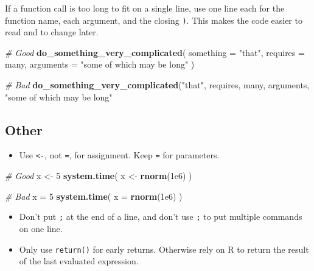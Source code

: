 \documentclass[]{book}
\newenvironment{Shaded}{\begin{snugshade}}{\end{snugshade}}
\newcommand{\KeywordTok}[1]{\textcolor[rgb]{0.13,0.29,0.53}{\textbf{#1}}}
\newcommand{\DataTypeTok}[1]{\textcolor[rgb]{0.13,0.29,0.53}{#1}}
\newcommand{\DecValTok}[1]{\textcolor[rgb]{0.00,0.00,0.81}{#1}}
\newcommand{\FloatTok}[1]{\textcolor[rgb]{0.00,0.00,0.81}{#1}}
\newcommand{\StringTok}[1]{\textcolor[rgb]{0.31,0.60,0.02}{#1}}
\newcommand{\CommentTok}[1]{\textcolor[rgb]{0.56,0.35,0.01}{\textit{#1}}}
\newcommand{\NormalTok}[1]{#1}
\providecommand{\tightlist}{%
  \setlength{\itemsep}{0pt}\setlength{\parskip}{0pt}}
\begin{document}
If a function call is too long to fit on a single line, use one line
each for the function name, each argument, and the closing \texttt{)}.
This makes the code easier to read and to change later.

\begin{Shaded}
\begin{Highlighting}[]
\CommentTok{# Good}
\KeywordTok{do_something_very_complicated}\NormalTok{(}
  \DataTypeTok{something =} \StringTok{"that"}\NormalTok{,}
  \DataTypeTok{requires  =}\NormalTok{ many,}
  \DataTypeTok{arguments =} \StringTok{"some of which may be long"}
\NormalTok{)}

\CommentTok{# Bad}
\KeywordTok{do_something_very_complicated}\NormalTok{(}\StringTok{"that"}\NormalTok{, requires, many, arguments,}
                              \StringTok{"some of which may be long"}
\end{Highlighting}
\end{Shaded}

\subsection{Other}\label{other}

\begin{itemize}
\tightlist
\item
  Use \texttt{\textless{}-}, not \texttt{=}, for assignment. Keep
  \texttt{=} for parameters.
\end{itemize}

\begin{Shaded}
\begin{Highlighting}[]
\CommentTok{# Good}
\NormalTok{x <-}\StringTok{ }\DecValTok{5}
\KeywordTok{system.time}\NormalTok{(}
\NormalTok{  x <-}\StringTok{ }\KeywordTok{rnorm}\NormalTok{(}\FloatTok{1e6}\NormalTok{)}
\NormalTok{)}

\CommentTok{# Bad}
\NormalTok{x =}\StringTok{ }\DecValTok{5}
\KeywordTok{system.time}\NormalTok{(}
  \DataTypeTok{x =} \KeywordTok{rnorm}\NormalTok{(}\FloatTok{1e6}\NormalTok{)}
\NormalTok{)}
\end{Highlighting}
\end{Shaded}

\begin{itemize}
\item
  Don't put \texttt{;} at the end of a line, and don't use \texttt{;} to
  put multiple commands on one line.
\item
  Only use \texttt{return()} for early returns. Otherwise rely on R to
  return the result of the last evaluated expression.
\end{itemize}
\end{document}
